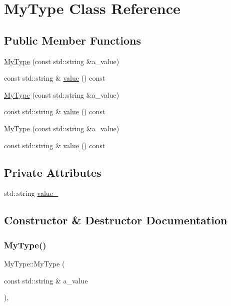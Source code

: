 \hypertarget{class_my_type}{}\section{My\+Type Class Reference}
\label{class_my_type}
\subsection*{Public Member Functions}
\begin{DoxyCompactItemize}
\item 
\mbox{\hyperlink{class_my_type_a74d6f29a06e298321a6e5f0b91b020e7}{My\+Type}} (const std\+::string \&a\+\_\+value)
\item 
const std\+::string \& \mbox{\hyperlink{class_my_type_a04eaace57f0ecd8ee8898defbdee31b4}{value}} () const
\item 
\mbox{\hyperlink{class_my_type_a74d6f29a06e298321a6e5f0b91b020e7}{My\+Type}} (const std\+::string \&a\+\_\+value)
\item 
const std\+::string \& \mbox{\hyperlink{class_my_type_a04eaace57f0ecd8ee8898defbdee31b4}{value}} () const
\item 
\mbox{\hyperlink{class_my_type_a74d6f29a06e298321a6e5f0b91b020e7}{My\+Type}} (const std\+::string \&a\+\_\+value)
\item 
const std\+::string \& \mbox{\hyperlink{class_my_type_a04eaace57f0ecd8ee8898defbdee31b4}{value}} () const
\end{DoxyCompactItemize}
\subsection*{Private Attributes}
\begin{DoxyCompactItemize}
\item 
std\+::string \mbox{\hyperlink{class_my_type_ae294bc35031fef7015a1b135deeedd22}{value\+\_\+}}
\end{DoxyCompactItemize}


\subsection{Constructor \& Destructor Documentation}
\mbox{\label{class_my_type_a74d6f29a06e298321a6e5f0b91b020e7}} 
\subsubsection{\texorpdfstring{MyType()}{MyType()}\hspace{0.1cm}{\footnotesize\ttfamily [1/3]}}
{\footnotesize\ttfamily My\+Type\+::\+My\+Type (\begin{DoxyParamCaption}\item[{const std\+::string \&}]{a\+\_\+value }\end{DoxyParamCaption})\hspace{0.3cm}{\ttfamily [inline]}, {\ttfamily [explicit]}}

